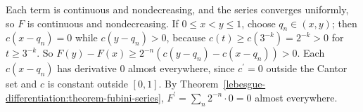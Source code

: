 \begin{solution}
Each term is continuous and nondecreasing, and the series converges uniformly, so $F$ is continuous and nondecreasing. If $0 \leq x < y \leq 1$, choose $q_n \in (x, y)$; then $c(x - q_n) = 0$ while
$c(y - q_n) > 0$, because $c(t) \geq c(3^{-k}) = 2^{-k} > 0$ for $t \geq 3^{-k}$. So $F(y) - F(x) \geq 2^{-n}(c(y - q_n) - c(x - q_n)) > 0$. Each $c(x - q_n)$ has derivative $0$ almost everywhere, since $c^{\prime} = 0$
outside the Cantor set and $c$ is constant outside $[0, 1]$. By Theorem~\ref{lebesgue-differentiation:theorem-fubini-series}, $F^{\prime} = \sum_n2^{-n}\cdot0 = 0$ almost everywhere.
\end{solution}
